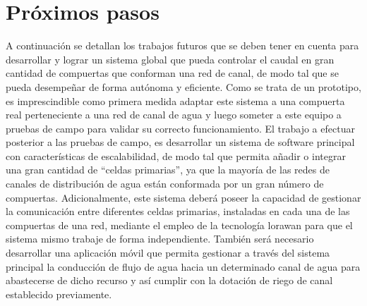 \section{Próximos pasos}

A continuación se detallan los trabajos futuros que se deben tener en cuenta para desarrollar y lograr un sistema global que pueda controlar el caudal en gran cantidad de compuertas que conforman una red de canal, de modo tal que se pueda desempeñar de forma autónoma y eficiente. 
Como se trata de un prototipo, es imprescindible como primera medida adaptar este sistema a una compuerta real perteneciente a una red de canal de agua y luego someter a este equipo a pruebas de campo para validar su correcto funcionamiento.
El trabajo a efectuar posterior a las pruebas de campo, es desarrollar un sistema de software principal con características de escalabilidad, de modo tal que permita añadir o integrar una gran cantidad de “celdas primarias”, ya que la mayoría de las redes de canales de distribución de agua están conformada por un gran número de compuertas. Adicionalmente, este sistema deberá poseer la capacidad de gestionar la comunicación entre diferentes celdas primarias, instaladas en cada una de las compuertas de una red, mediante el empleo de la tecnología lorawan para que el sistema mismo trabaje de forma independiente. También será necesario desarrollar una aplicación móvil que permita gestionar a través del sistema principal la conducción de flujo de agua hacia un determinado canal de agua para abastecerse de dicho recurso y así cumplir con la dotación de riego de canal establecido previamente.


